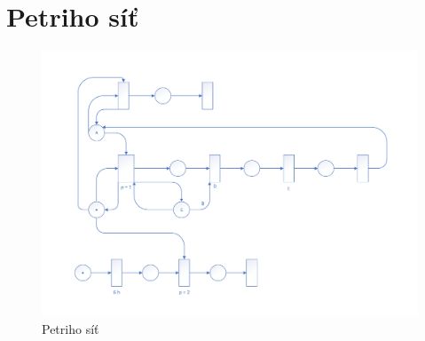 \documentclass[a4paper, 11pt]{article}
\begin{document}
	\clearpage
	\appendix

	\section{Petriho síť}
	\begin{figure}[!ht]
		\centering
		\vspace{-1.2cm}
		\includegraphics[width=0.95\linewidth]{inc/petri_net.pdf}
		\caption{Petriho síť}
		\label{figure:petri_net}
	\end{figure}
\end{document}
